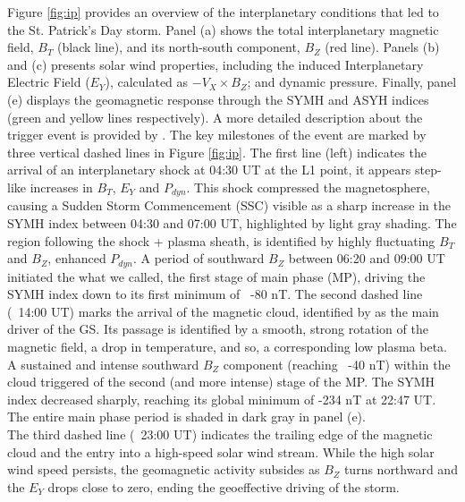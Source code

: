 \documentclass[a4paper]{article}
\theoremstyle{plain}
\theoremstyle{definition}
\begin{document}
	
	Figure \ref{fig:ip} provides an overview of the interplanetary conditions that led to the St. Patrick's Day storm. Panel (a) shows the total interplanetary magnetic field, $B_T$ (black line), and its north-south component, $B_Z$ (red line). Panels (b) and (c) presents solar wind properties, including the induced Interplanetary Electric Field ($E_Y$), calculated as $-V_X \times B_Z$; and dynamic pressure. Finally, panel (e) displays the geomagnetic response through the SYMH and ASYH indices (green and yellow lines respectively). A more detailed description about the trigger event is provided by \cite{stpatrick_ref}. The key milestones of the event are marked by three vertical dashed lines in Figure \ref{fig:ip}. The first line (left) indicates the arrival of an interplanetary shock at 04:30 UT at the L1 point, it appears step-like increases in $B_T$, $E_Y$ and $P_{dyn}$. This shock compressed the magnetosphere, causing a Sudden Storm Commencement (SSC) visible as a sharp increase in the SYMH index between 04:30 and 07:00 UT, highlighted by light gray shading. The region following the shock + plasma sheath, is identified by highly fluctuating $B_T$ and $B_Z$, enhanced $P_{dyn}$. A period of southward $B_Z$ between 06:20 and 09:00 UT initiated the what we called, the first stage of main phase (MP), driving the SYMH index down to its first minimum of ~-80 nT. The second dashed line (~14:00 UT) marks the arrival of the magnetic cloud, identified by \cite{stpatrick_ref} as the main driver of the GS. Its passage is identified by a smooth, strong rotation of the magnetic field, a drop in temperature, and so, a corresponding low plasma beta. A sustained and intense southward $B_Z$ component (reaching ~-40 nT) within the cloud triggered of the second (and more intense) stage of the MP. The SYMH index decreased sharply, reaching its global minimum of -234 nT at 22:47 UT. The entire main phase period is shaded in dark gray in panel (e). \\
	
	The third dashed line (~23:00 UT) indicates the trailing edge of the magnetic cloud and the entry into a high-speed solar wind stream. While the high solar wind speed persists, the geomagnetic activity subsides as $B_Z$ turns northward and the $E_Y$ drops close to zero, ending the geoeffective driving of the storm.\\
	
\end{document}
